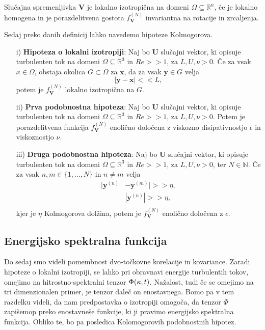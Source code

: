 \documentclass[mat2, tisk]{fmfdelo}
\newcommand{\R}{\mathbb R}
\newcommand{\N}{\mathbb N}
\newcommand{\bd}{\textbf}
\begin{document}
\begin{definicija}
Slučajna spremenljivka $\bd{V}$ je lokalno izotropična na domeni 
$\Omega \subseteq \R^n$, če je lokalno homogena in je porazdelitvena 
gostota $f_\bd{V}^{(N)}$ invariantna na rotacije in zrcaljenja.
\end{definicija}

Sedaj preko danih definicij lahko navedemo hipoteze Kolmogorova.

\begin{enumerate}
  \item[i)] \textbf{Hipoteza o lokalni izotropiji}: Naj bo $\bd{U}$ slučajni vektor,
  ki opisuje turbulenten tok na domeni $\Omega \subseteq \R^3$ in $Re >\!\!> 1$, za $L, U, \nu > 0$. Če 
  za vsak $x\in \Omega$, obstaja okolica $G \subset \Omega$ za $\bd{x}$, da za vsak 
  $\bd{y}\in G$ velja $$ |\bd{y} - \bd{x}| <\!\!< L,$$ potem je $f_\bd{V}^{(N)}$ lokalno 
  izotropična na $G$.
  \item[ii)] \textbf{Prva podobnostna hipoteza}: Naj bo $\bd{U}$ slučajni vektor,
  ki opisuje turbulenten tok na domeni $\Omega \subseteq \R^3$ in $Re >\!\!> 1$, za $L, U, \nu > 0$.
  Potem je porazdelitvena funkcija $f_\bd{V}^{(N)}$ enolično določena 
  z viskozno disipativnostjo $\epsilon$ in viskoznostjo $\nu$.
  \item[iii)] \textbf{Druga podobnostna hipoteza}: Naj bo $\bd{U}$ slučajni vektor,
  ki opisuje turbulenten tok na domeni $\Omega \subseteq \R^3$ in $Re >\!\!> 1$, za $L, U, \nu > 0$, ter $N\in \N$.
  Če za vsak $n, m \in \{1, \dots, N\}$ in $n\neq m$ velja 
  \begin{align*}
  |\bd{y}^{(n)} &- \bd{y}^{(m)}| >\!\!> \eta,\\
  &|\bd{y}^{(n)}|>\!\!> \eta, \\
\end{align*}
kjer je $\eta$ Kolmogorova dolžina, potem je $f_\bd{V}^{(N)}$ enolično 
določena z $\epsilon$.
\end{enumerate}

\subsection{Energijsko spektralna funkcija}

Do sedaj smo videli pomembnost dvo-točkovne korelacije in kovariance. 
Zaradi hipoteze o lokalni izotropiji, se lahko pri obravnavi 
energije turbulentih tokov, omejimo na hitrostno-spektralni tenzor $\Phi(\text{\bd{$\kappa$}}, t)$. 
Nažalost, tudi če se omejimo na tri dimenzionalen primer, 
je tenzor daleč on enostavnega. Bomo pa v tem razdelku videli, 
da nam predpostavka o izotropiji omogoča, da tenzor $\Phi$ zapišemop 
preko enostavneše funkcije, ki ji pravimo energijsko spektralna funkcija.
Obliko te, bo pa posledica Kolomogorovih podobnostnih hipotez. 
\end{document}
